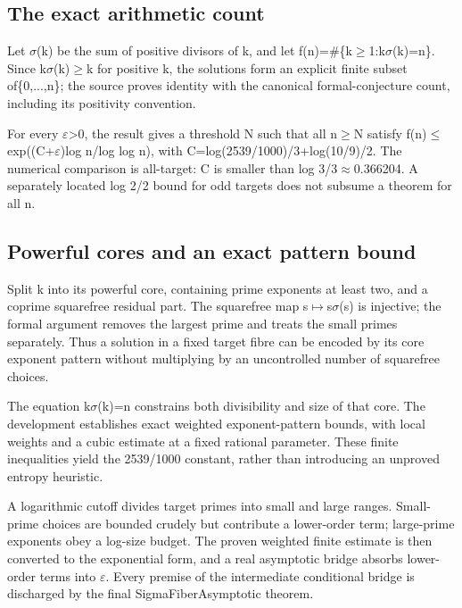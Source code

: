 \documentclass[11pt,a4paper]{article}
\begin{document}
\subsection{The exact arithmetic count}
Let \ensuremath{\sigma}(k) be the sum of positive divisors of k, and let f(n)=\#\{k\ensuremath{\geq}1:k\ensuremath{\sigma}(k)=n\}. Since k\ensuremath{\sigma}(k)\ensuremath{\geq}k for positive k, the solutions form an explicit finite subset of\{0,...,n\}; the source proves identity with the canonical formal-conjecture count, including its positivity convention.

For every \ensuremath{\varepsilon}>0, the result gives a threshold N such that all n\ensuremath{\geq}N satisfy f(n)\ensuremath{\leq}exp((C+\ensuremath{\varepsilon})log n/log log n), with C=log(2539/1000)/3+log(10/9)/2. The numerical comparison is all-target: C is smaller than log 3/3\ensuremath{\approx}0.366204. A separately located log 2/2 bound for odd targets does not subsume a theorem for all n.

\subsection{Powerful cores and an exact pattern bound}
Split k into its powerful core, containing prime exponents at least two, and a coprime squarefree residual part. The squarefree map s\ensuremath{\mapsto}s\ensuremath{\sigma}(s) is injective; the formal argument removes the largest prime and treats the small primes separately. Thus a solution in a fixed target fibre can be encoded by its core exponent pattern without multiplying by an uncontrolled number of squarefree choices.

The equation k\ensuremath{\sigma}(k)=n constrains both divisibility and size of that core. The development establishes exact weighted exponent-pattern bounds, with local weights and a cubic estimate at a fixed rational parameter. These finite inequalities yield the 2539/1000 constant, rather than introducing an unproved entropy heuristic.

A logarithmic cutoff divides target primes into small and large ranges. Small-prime choices are bounded crudely but contribute a lower-order term; large-prime exponents obey a log-size budget. The proven weighted finite estimate is then converted to the exponential form, and a real asymptotic bridge absorbs lower-order terms into \ensuremath{\varepsilon}. Every premise of the intermediate conditional bridge is discharged by the final SigmaFiberAsymptotic theorem.
\end{document}

